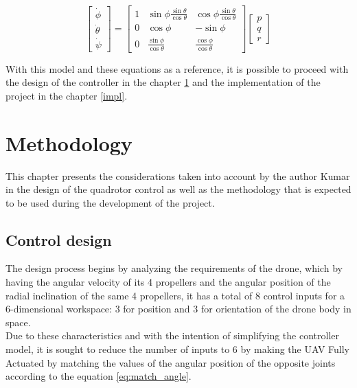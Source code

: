 \documentclass[a4paper, 12pt, oneside]{book}
\begin{document}
\begin{equation}
\begin{bmatrix}
\dot{\phi}\\ 
\dot{\theta}\\ 
\dot{\psi}
\end{bmatrix}
=
\begin{bmatrix}
1 & \sin\phi\frac{\sin\theta}{\cos\theta} & \cos\phi\frac{\sin\theta}{\cos\theta} \\ 
0 & \cos\phi & -\sin\phi \\ 
0 & \frac{\sin\phi}{\cos\theta} & \frac{\cos\phi}{\cos\theta}
\end{bmatrix}
\begin{bmatrix}
p\\ 
q\\ 
r
\end{bmatrix}
\label{eq:rotation_world}
\end{equation}

With this model and these equations as a reference, it is possible to proceed with the design of the controller in the chapter \ref{meth} and the implementation of the project in the chapter \ref{impl}.

\chapter{Methodology}\label{meth}
This chapter presents the considerations taken into account by the author Kumar in the design of the quadrotor control as well as the methodology that is expected to be used during the development of the project.

\section{Control design}\label{control}
The design process begins by analyzing the requirements of the drone, which by having the angular velocity of its 4 propellers and the angular position of the radial inclination of the same 4 propellers, it has a total of 8 control inputs for a 6-dimensional workspace: 3 for position and 3 for orientation of the drone body in space.\\

Due to these characteristics and with the intention of simplifying the controller model, it is sought to reduce the number of inputs to 6 by making the UAV Fully Actuated by matching the values of the angular position of the opposite joints according to the equation \ref{eq:match_angle}.
\end{document}

